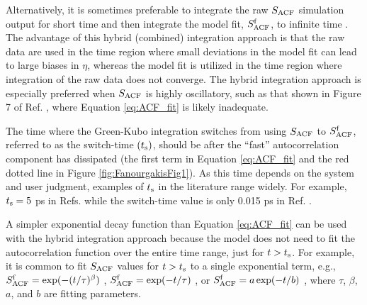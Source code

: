 \documentclass[9pt,bestpractices]{livecoms}
\begin{document}
Alternatively, it is sometimes preferable to integrate the raw $S_{\rm ACF}$ simulation output for short time and then integrate the model fit, $S^{\rm f}_{\rm ACF}$, to infinite time \cite{vanderSpoel1998,Shirts2013,Fernandez2005}. The advantage of this hybrid (combined) integration approach is that the raw data are used in the time region where small deviations in the model fit can lead to large biases in $\eta$, whereas the model fit is utilized in the time region where integration of the raw data does not converge. The hybrid integration approach is especially preferred when $S_{\rm ACF}$ is highly oscillatory, such as that shown in Figure 7 of Ref. \cite{Fernandez2005}, where Equation \ref{eq:ACF_fit} is likely inadequate. 

The time where the Green-Kubo integration switches from using $S_{\rm ACF}$ to $S^{\rm f}_{\rm ACF}$, referred to as the switch-time $(t_{\rm s})$, should be after the ``fast'' autocorrelation component has dissipated (the first term in Equation \ref{eq:ACF_fit} and the red dotted line in Figure \ref{fig:FanourgakisFig1}). As this time depends on the system and user judgment, examples of $t_{\rm s}$ in the literature range widely. For example, $t_{\rm s} = 5$ ps in Refs. \cite{vanderSpoel1998,Shirts2013} while the switch-time value is only 0.015 ps in Ref. \cite{Fernandez2005}.  

A simpler exponential decay function than Equation \ref{eq:ACF_fit} can be used with the hybrid integration approach because the model does not need to fit the autocorrelation function over the entire time range, just for $t > t_{\rm s}$. For example, it is common to fit $S_{\rm ACF}$ values for $t > t_{\rm s}$ to a single exponential term, e.g., $S^{\rm f}_{\rm ACF} = \exp(-(t/\tau)^\beta)$ \cite{vanderSpoel1998}, $S^{\rm f}_{\rm ACF} = \exp(-t/\tau)$ \cite{Shirts2013}, or $S^{\rm f}_{\rm ACF} = a \exp(-t/b)$ \cite{Fernandez2005}, where $\tau$, $\beta$, $a$, and $b$ are fitting parameters. 

\end{document}
